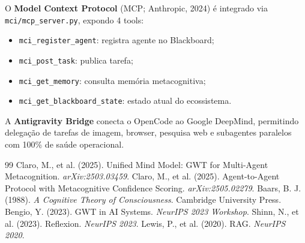 O \textbf{Model Context Protocol} (MCP; Anthropic, 2024) é integrado via \texttt{mci/mcp\_server.py}, expondo 4 tools:

\begin{itemize}
    \item \texttt{mci\_register\_agent}: registra agente no Blackboard;
    \item \texttt{mci\_post\_task}: publica tarefa;
    \item \texttt{mci\_get\_memory}: consulta memória metacognitiva;
    \item \texttt{mci\_get\_blackboard\_state}: estado atual do ecossistema.
\end{itemize}

A \textbf{Antigravity Bridge} conecta o OpenCode ao Google DeepMind, permitindo delegação de tarefas de imagem, browser, pesquisa web e subagentes paralelos com 100\% de saúde operacional.

\begin{thebibliography}{99}
 Claro, M., et al. (2025). Unified Mind Model: GWT for Multi-Agent Metacognition. \textit{arXiv:2503.03459}.
 Claro, M., et al. (2025). Agent-to-Agent Protocol with Metacognitive Confidence Scoring. \textit{arXiv:2505.02279}. 
 Baars, B. J. (1988). \textit{A Cognitive Theory of Consciousness}. Cambridge University Press.
 Bengio, Y. (2023). GWT in AI Systems. \textit{NeurIPS 2023 Workshop}.
 Shinn, N., et al. (2023). Reflexion. \textit{NeurIPS 2023}. 
 Lewis, P., et al. (2020). RAG. \textit{NeurIPS 2020}. 
\end{thebibliography}
